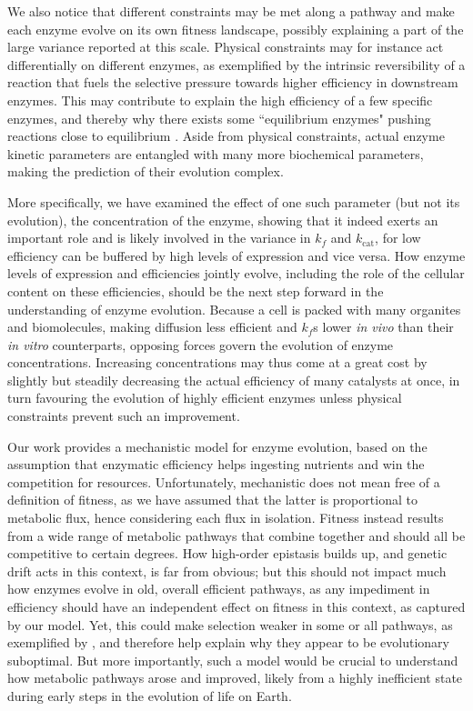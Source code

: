 \documentclass[11pt,onecolumn]{article}
\begin{document}
We also notice that different constraints may be met along a pathway and make each enzyme evolve on its own fitness landscape, possibly explaining a part of the large variance reported at this scale. Physical constraints may for instance act differentially on different enzymes, as exemplified by the intrinsic reversibility of a reaction that fuels the selective pressure towards higher efficiency in downstream enzymes. This may contribute to explain the high efficiency of a few specific enzymes, and thereby why there exists some ``equilibrium enzymes" pushing reactions close to equilibrium \citep{Williamson67,Davidi18}.
Aside from physical constraints, actual enzyme kinetic parameters are entangled with many more biochemical parameters, making the prediction of their evolution complex. 

More specifically, we have examined the effect of one such parameter (but not its evolution), the concentration of the enzyme, showing that it indeed exerts an important role and is likely involved in the variance in $k_f$ and $k_\text{cat}$, for low efficiency can be buffered by high levels of expression and vice versa. How enzyme levels of expression and efficiencies jointly evolve, including the role of the cellular content on these efficiencies, should be the next step forward in the understanding of enzyme evolution. Because a cell is packed with many organites and biomolecules, making diffusion less efficient and $k_f$s lower \textit{in vivo} than their \textit{in vitro} counterparts, opposing forces govern the evolution of enzyme concentrations. Increasing concentrations may thus come at a great cost by slightly but steadily decreasing the actual efficiency of many catalysts at once, in turn favouring the evolution of highly efficient enzymes unless physical constraints prevent such an improvement.

Our work provides a mechanistic model for enzyme evolution, based on the assumption that enzymatic efficiency helps ingesting nutrients and win the competition for resources. Unfortunately, mechanistic does not mean free of a definition of fitness, as we have assumed that the latter is proportional to metabolic flux, hence considering each flux in isolation. Fitness instead results from a wide range of metabolic pathways that combine together and should all be competitive to certain degrees. How high-order epistasis builds up, and genetic drift acts in this context, is far from obvious; but this should not impact much how enzymes evolve in old, overall efficient pathways, as any impediment in efficiency should have an independent effect on fitness in this context, as captured by our model. Yet, this could make selection weaker in some or all pathways, as exemplified by \citet{Heckmann18}, and therefore help explain why they appear to be evolutionary suboptimal. But more importantly, such a model would be crucial to understand how metabolic pathways arose and improved, likely from a highly inefficient state during early steps in the evolution of life on Earth.
\end{document}

